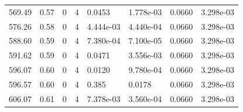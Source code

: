 \documentclass[preview]{standalone}
\begin{document}
{{{{\begin{tabular}{L{1.2cm}C{1.2cm} C{0.3cm}C{0.5cm} C{1.4cm}C{1.4cm} C{1.4cm}C{1.4cm}}
  569.49  &  0.57  & 0     &  4 &  0.0453  & 1.778e-03  & 0.0660 &  3.298e-03   \\ 
  576.26  &  0.58  & 0     &  4 &  4.444e-03  & 4.440e-04  & 0.0660 &  3.298e-03   \\ 
  588.60  &  0.59  & 0     &  4 &  7.380e-04  & 7.100e-05  & 0.0660 &  3.298e-03   \\ 
  591.62  &  0.59  & 0     &  4 &  0.0471  & 3.556e-03  & 0.0660 &  3.298e-03   \\ 
  596.07  &  0.60  & 0     &  4 &  0.0120  & 9.780e-04  & 0.0660 &  3.298e-03   \\ 
  596.57  &  0.60  & 0     &  4 &  0.385  & 0.0178  & 0.0660 &  3.298e-03   \\ 
  606.07  &  0.61  & 0     &  4 &  7.378e-03  & 3.560e-04  & 0.0660 &  3.298e-03   \\ 
\hline 
\end{tabular} 

}}}}
\end{document}
